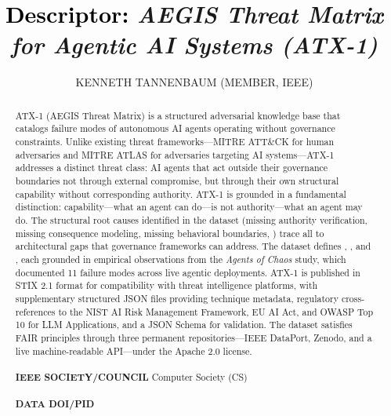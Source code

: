 \documentclass{IEEEoj-data}
\begin{document}
\title{\textcolor{black}{Descriptor:} \textcolor{ieeedata}{\textit{ AEGIS\deleted{\texttrademark{}} Threat Matrix for Agentic AI Systems (ATX-1)}}}

\author{KENNETH TANNENBAUM (MEMBER, IEEE)}

\begin{abstract}
ATX-1 (AEGIS Threat Matrix) is a structured adversarial knowledge base that catalogs failure modes of autonomous AI agents operating without governance constraints. Unlike existing threat frameworks---MITRE ATT\&CK for human adversaries and MITRE ATLAS for adversaries targeting AI systems---ATX-1 addresses a distinct threat class: AI agents that act outside their governance boundaries not through external compromise, but through their own structural capability without corresponding authority. ATX-1 is grounded in a fundamental distinction: capability---what an agent can do---is not authority---what an agent may do. The  structural root causes identified in the dataset (missing authority verification, missing consequence modeling, missing behavioral boundaries, ) trace all  to architectural gaps that governance frameworks can address. The dataset defines , , and , each grounded in empirical observations from the {\it Agents of Chaos} study, which documented 11 failure modes across live agentic deployments. ATX-1 is published in STIX 2.1 format for compatibility with threat intelligence platforms, with supplementary structured JSON files providing technique metadata, regulatory cross-references to the NIST AI Risk Management Framework, EU AI Act, and OWASP Top 10 for LLM Applications, and a JSON Schema for validation. The dataset satisfies FAIR principles through three permanent repositories---IEEE DataPort, Zenodo, and a live machine-readable API---under the Apache 2.0 license.\\
\\
{\textcolor{ieeedata}{\abstractheadfont\bfseries{IEEE SOCIETY/COUNCIL}}} Computer Society (CS)\\
\\
{\textcolor{ieeedata}{\abstractheadfont\bfseries{DATA DOI/PID}}} \\


\end{abstract}
\end{document}
